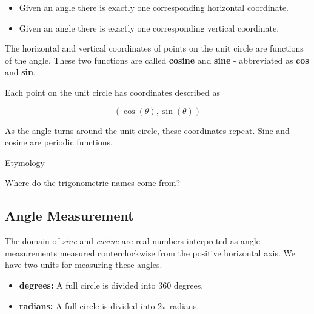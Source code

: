 \documentclass{ximera}
\begin{document}
\begin{example}
\begin{itemize}
\item Given an angle there is exactly one corresponding horizontal coordinate.
\item Given an angle there is exactly one corresponding vertical coordinate. 
\end{itemize}


The horizontal and vertical coordinates of points on the unit circle are functions of the angle.  These two functions are called \textbf{cosine} and \textbf{sine} - abbreviated as \textbf{cos} and \textbf{sin}.

Each point on the unit circle has coordinates described as 

\[  (\cos(\theta), \sin(\theta))  \] 

As the angle turns around the unit circle, these coordinates repeat. Sine and cosine are periodic functions.

\end{example}




\begin{remark}  Etymology


Where do the trigonometric names come from?  

\end{remark}











\subsection*{Angle Measurement}

The domain of \textit{sine} and \textit{cosine} are real numbers interpreted as angle measurements measured couterclockwise from the positive horizontal axis.  We have two units for measuring these angles.


\begin{itemize}
\item \textbf{degrees:}  A full circle is divided into $360$ degrees.
\item \textbf{radians:}  A full circle is divided into $2\pi$ radians.
\end{itemize}
\end{document}
